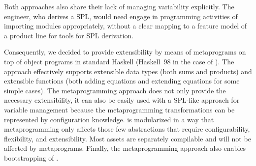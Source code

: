 Both approaches also share their lack of managing variability
explicitly. The engineer, who derives a SPL, would need engage in
programming activities of importing modules appropriately, without a
clear mapping to a feature model of a product line for tools for SPL
derivation.

Consequently, we decided to provide extensibility by means of
metaprograms on top of object programs in standard Haskell (Haskell~98
in the case of \hpl). The approach effectively supports extensible
data types (both sums and products) and extensible functions (both
adding equations and extending equations for some simple cases).  The
metaprogramming approach does not only provide the necessary
extensibility, it can also be easily used with a SPL-like approach for
variable management because the metaprogramming transformations can be
represented by configuration knowledge. \hpl{} is modularized in a way
that metaprogramming only affects those few abstractions that require
configurability, flexibility, and extensibility. Most assets are
separately compilable and will not be affected by metaprograms.
Finally, the metaprogramming approach also enables bootstrapping of
\hpl.

